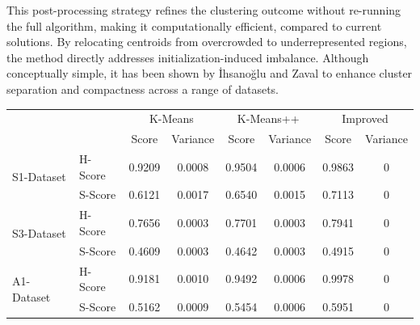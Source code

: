 \documentclass[10pt,twocolumn,letterpaper]{article}
\begin{document}
This post-processing strategy refines the clustering outcome without re-running
the full algorithm, making it computationally efficient, compared to current
solutions. By relocating centroids from overcrowded to underrepresented
regions, the method directly addresses initialization-induced imbalance.
Although conceptually simple, it has been shown by İhsanoğlu and Zaval to
enhance cluster separation and compactness across a range of datasets.


\begin{table}
    \centering
    \begin{tabular}{ll c c c c c c}
        \toprule
                                    &         & \multicolumn{2}{c}{K-Means} & \multicolumn{2}{c}{K-Means++} & \multicolumn{2}{c}{Improved}                                \\
        \cmidrule(lr){3-4} \cmidrule(lr){5-6} \cmidrule(lr){7-8}
                                    &         & Score                       & Variance                      & Score                        & Variance & Score  & Variance \\
        \midrule
        \multirow{2}{*}{S1-Dataset} & H-Score & 0.9209                      & 0.0008                        & 0.9504                       & 0.0006   & 0.9863 & 0        \\
                                    & S-Score & 0.6121                      & 0.0017                        & 0.6540                       & 0.0015   & 0.7113 & 0        \\
        \midrule
        \multirow{2}{*}{S3-Dataset} & H-Score & 0.7656                      & 0.0003                        & 0.7701                       & 0.0003   & 0.7941 & 0        \\
                                    & S-Score & 0.4609                      & 0.0003                        & 0.4642                       & 0.0003   & 0.4915 & 0        \\
        \midrule
        \multirow{2}{*}{A1-Dataset} & H-Score & 0.9181                      & 0.0010                        & 0.9492                       & 0.0006   & 0.9978 & 0        \\
                                    & S-Score & 0.5162                      & 0.0009                        & 0.5454                       & 0.0006   & 0.5951 & 0        \\
        \midrule

\end{tabular}
\end{table}
\end{document}
